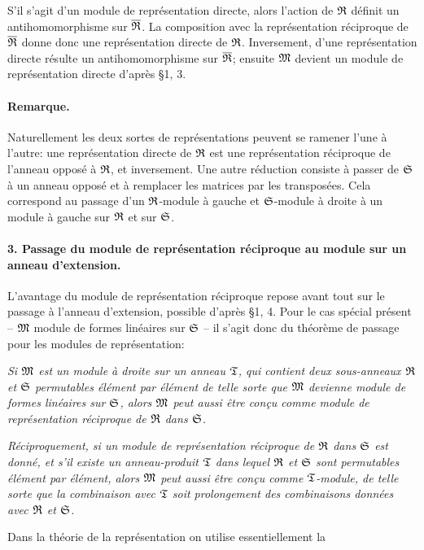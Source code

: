 S'il s'agit d'un module de représentation directe, alors l'action de \(\mathfrak R\) définit un antihomomorphisme sur \(\overline{\mathfrak R}\). La composition avec la représentation réciproque de \(\overline{\mathfrak R}\) donne donc une représentation directe de \(\mathfrak R\). Inversement, d'une représentation directe résulte un antihomomorphisme sur \(\overline{\mathfrak R}\); ensuite \(\mathfrak M\) devient un module de représentation directe d'après \S 1, 3.

\paragraph{Remarque.}
Naturellement les deux sortes de représentations peuvent se ramener l'une à l'autre: une représentation directe de \(\mathfrak R\) est une représentation réciproque de l'anneau opposé à \(\mathfrak R\), et inversement. Une autre réduction consiste à passer de \(\mathfrak S\) à un anneau opposé et à remplacer les matrices par les transposées. Cela correspond au passage d'un \(\mathfrak R\)-module à gauche et \(\mathfrak S\)-module à droite à un module à gauche sur \(\mathfrak R\) et sur \(\mathfrak S\).

\paragraph{3. Passage du module de représentation réciproque au module sur un anneau d'extension.}
L'avantage du module de représentation réciproque repose avant tout sur le passage à l'anneau d'extension, possible d'après \S 1, 4. Pour le cas spécial présent -- \(\mathfrak M\) module de formes linéaires sur \(\mathfrak S\) -- il s'agit donc du théorème de passage pour les modules de représentation:

\emph{Si \(\mathfrak M\) est un module à droite sur un anneau \(\mathfrak T\), qui contient deux sous-anneaux \(\mathfrak R\) et \(\mathfrak S\) permutables élément par élément de telle sorte que \(\mathfrak M\) devienne module de formes linéaires sur \(\mathfrak S\), alors \(\mathfrak M\) peut aussi être conçu comme module de représentation réciproque de \(\mathfrak R\) dans \(\mathfrak S\).}

\emph{Réciproquement, si un module de représentation réciproque de \(\mathfrak R\) dans \(\mathfrak S\) est donné, et s'il existe un anneau-produit \(\mathfrak T\) dans lequel \(\mathfrak R\) et \(\mathfrak S\) sont permutables élément par élément, alors \(\mathfrak M\) peut aussi être conçu comme \(\mathfrak T\)-module, de telle sorte que la combinaison avec \(\mathfrak T\) soit prolongement des combinaisons données avec \(\mathfrak R\) et \(\mathfrak S\).}

Dans la théorie de la représentation on utilise essentiellement la

